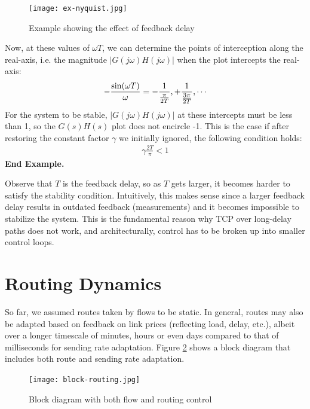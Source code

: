\documentclass{article}
\def\sn{{\rm sin}}
\begin{document}
\begin{figure}[htbp] %
   \centering
   \texttt{[image: ex-nyquist.jpg]} 
   \caption{Example showing the effect of feedback delay}
   \label{fig:ex-nyquist}
\end{figure}

Now, at these values of $\omega T$, we can determine the points of interception along the real-axis, i.e.
the magnitude $|G(j \omega) H(j \omega)|$ when the plot intercepts the real-axis:
\begin{eqnarray*}
 - \frac{\sn(\omega T)}{\omega} = - \frac{1}{\frac{\pi}{2T}}, +\frac{1}{\frac{3 \pi}{2T}}, \cdots
\end{eqnarray*}
For the system to be stable, $|G(j \omega) H(j \omega)|$ at these intercepts must be less than 1,
so the $G(s) H(s)$ plot does not encircle -1.
This is the case if after restoring the constant factor $\gamma$ we initially ignored, 
the following condition holds:
\begin{eqnarray*}
\gamma \frac{2T}{\pi} < 1
\end{eqnarray*}  {\bf End Example.}


Observe that $T$ is the feedback delay, so as $T$ gets larger, it becomes harder to satisfy the stability condition.
Intuitively, this makes sense since a larger feedback delay results in outdated feedback (measurements) and 
it becomes impossible to stabilize the system. 
This is the fundamental reason why TCP over long-delay paths does not work, and
architecturally, control has to be broken up into smaller control loops.


\section{Routing Dynamics}
\label{sec:routing}

So far, we assumed routes taken by flows to be static. In general, routes may also be adapted based on feedback on link prices (reflecting load, delay, etc.), 
albeit over a longer timescale of minutes, hours or even days compared to that of milliseconds for sending rate adaptation.
Figure \ref{fig:block-routing} shows a block diagram that includes both route and sending rate adaptation.
\begin{figure}[htbp]
   \centering
   \texttt{[image: block-routing.jpg]} %
   \caption{Block diagram with both flow and routing control}
   \label{fig:block-routing}
\end{figure}
\end{document}
